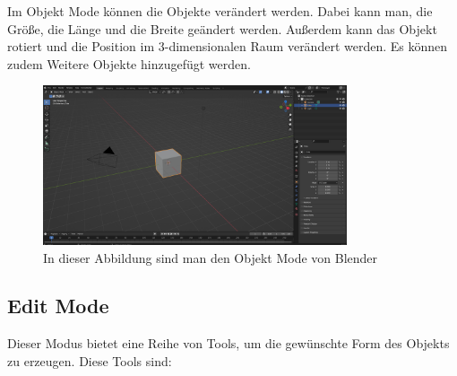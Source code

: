 Im Objekt Mode können die Objekte verändert werden.
Dabei kann man, die Größe, die Länge und die Breite geändert werden.
Außerdem kann das Objekt rotiert und die Position im 3-dimensionalen Raum verändert werden. 
Es können zudem Weitere Objekte hinzugefügt werden.
\begin{figure}[H]
    \centering
    \includegraphics[width=0.8\textwidth]{chapters/13/images/3D-Viewport.png}
    \caption{In dieser Abbildung sind man den Objekt Mode von Blender}
    \label{UST-8}
\end{figure}


\subsection{Edit Mode}
Dieser Modus bietet eine Reihe von Tools, um die gewünschte Form des Objekts zu erzeugen.
Diese Tools sind:


